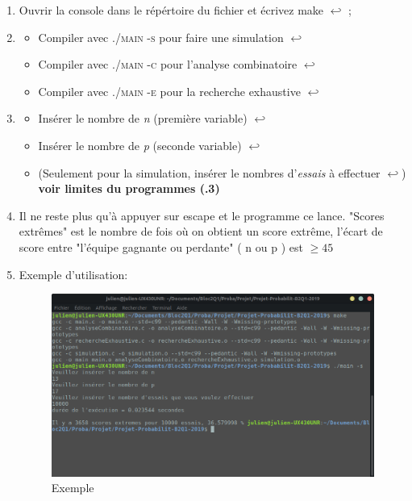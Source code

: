 \documentclass[a4paper, 11pt, oneside]{article}
\begin{document}
	\begin{enumerate}
	
\item Ouvrir la console dans le répértoire du fichier et écrivez make $\hookleftarrow$ ;
\item \begin{itemize}[label=$\square$]
	\item Compiler avec \textsc{./main -s} pour faire une simulation $\hookleftarrow$
	\item Compiler avec \textsc{./main -c} pour l'analyse combinatoire $\hookleftarrow$
	\item Compiler avec \textsc{./main -e} pour la recherche exhaustive $\hookleftarrow$
\end{itemize}
\item \begin{itemize}[label=$\square$]

	\item Insérer le nombre de \textit{n} (première variable) $\hookleftarrow$ 
	\item Insérer le nombre de \textit{p} (seconde variable) $\hookleftarrow$
	\item (Seulement pour la simulation, insérer le nombres d'\textit{essais} à effectuer $\hookleftarrow$)\\ 

	\textbf{\color{BrickRed} \danger voir limites du programmes (.3)}
	\end{itemize}
	\item Il ne reste plus qu'à appuyer sur escape et le programme ce lance. "Scores extrêmes" est le nombre de fois où on obtient un score extrême, l'écart de score entre "l'équipe gagnante ou perdante" ( n ou p ) est $ \geq 45 $
\item Exemple d'utilisation: \\ \begin{figure}[!h]
			\centering
\includegraphics[scale=0.5]{exemple.png}
			\caption{Exemple}
		\end{figure}
		
\end{enumerate}
\end{document}
